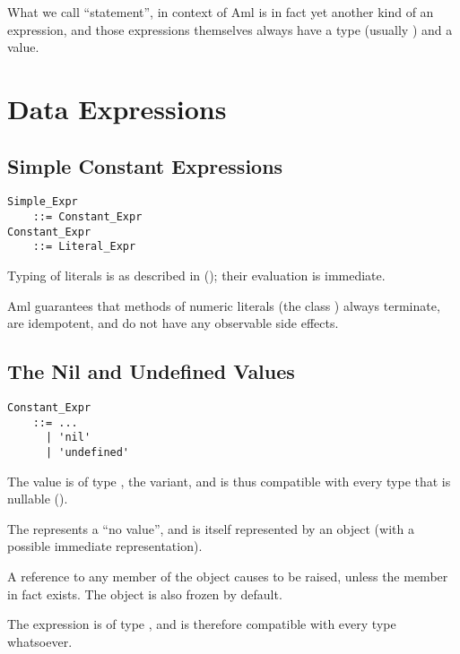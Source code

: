 What we call ``statement'', in context of Aml is in fact yet another kind of an expression, and those expressions themselves always have a type (usually ) and a value. 





\section{Data Expressions}





\subsection{Simple Constant Expressions}
\label{sec:literal-expr}

\grammar\begin{lstlisting}
Simple_Expr 
    ::= Constant_Expr
Constant_Expr
    ::= Literal_Expr
\end{lstlisting}

Typing of literals is as described in (); their evaluation is immediate. 

Aml guarantees that methods of numeric literals (the class ) always terminate, are idempotent, and do not have any observable side effects. 






\subsection{The Nil and Undefined Values}

\grammar\begin{lstlisting}
Constant_Expr 
    ::= ...
      | 'nil'
      | 'undefined'
\end{lstlisting}

The  value is of type , the  variant, and is thus compatible with every type that is nullable ().

The  represents a ``no value'', and is itself represented by an object (with a possible immediate representation). 

A reference to any member of the  object causes  to be raised, unless the member in fact exists. The  object is also frozen by default. 

The  expression is of type , and is therefore compatible with every type whatsoever. 

